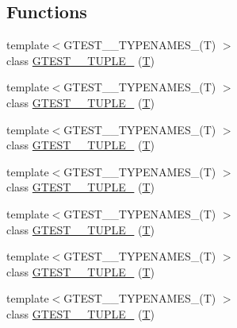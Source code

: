 \subsection*{Functions}
\begin{DoxyCompactItemize}
\item 
{\footnotesize template$<$G\-T\-E\-S\-T\-\_\-\_\-\-T\-Y\-P\-E\-N\-A\-M\-E\-S\-\_\-(\-T) $>$ }\\class \hyperlink{namespacestd_1_1tr1_a9971f52f994f142fe36c786b991cfd3e}{G\-T\-E\-S\-T\-\_\-\_\-\-T\-U\-P\-L\-E\-\_\-} (\hyperlink{calib3d_8hpp_a3efb9551a871ddd0463079a808916717}{T})
\item 
{\footnotesize template$<$G\-T\-E\-S\-T\-\_\-\_\-\-T\-Y\-P\-E\-N\-A\-M\-E\-S\-\_\-(\-T) $>$ }\\class \hyperlink{namespacestd_1_1tr1_a05651180c3a4c06fe0f3b09144b82b93}{G\-T\-E\-S\-T\-\_\-\_\-\-T\-U\-P\-L\-E\-\_\-} (\hyperlink{calib3d_8hpp_a3efb9551a871ddd0463079a808916717}{T})
\item 
{\footnotesize template$<$G\-T\-E\-S\-T\-\_\-\_\-\-T\-Y\-P\-E\-N\-A\-M\-E\-S\-\_\-(\-T) $>$ }\\class \hyperlink{namespacestd_1_1tr1_a368170c49cc7d7f130c0564bbad01205}{G\-T\-E\-S\-T\-\_\-\_\-\-T\-U\-P\-L\-E\-\_\-} (\hyperlink{calib3d_8hpp_a3efb9551a871ddd0463079a808916717}{T})
\item 
{\footnotesize template$<$G\-T\-E\-S\-T\-\_\-\_\-\-T\-Y\-P\-E\-N\-A\-M\-E\-S\-\_\-(\-T) $>$ }\\class \hyperlink{namespacestd_1_1tr1_a661b17d2b7137863f06a016762f5c888}{G\-T\-E\-S\-T\-\_\-\_\-\-T\-U\-P\-L\-E\-\_\-} (\hyperlink{calib3d_8hpp_a3efb9551a871ddd0463079a808916717}{T})
\item 
{\footnotesize template$<$G\-T\-E\-S\-T\-\_\-\_\-\-T\-Y\-P\-E\-N\-A\-M\-E\-S\-\_\-(\-T) $>$ }\\class \hyperlink{namespacestd_1_1tr1_a51b070e2eb5e6bb83a290f35c19667dd}{G\-T\-E\-S\-T\-\_\-\_\-\-T\-U\-P\-L\-E\-\_\-} (\hyperlink{calib3d_8hpp_a3efb9551a871ddd0463079a808916717}{T})
\item 
{\footnotesize template$<$G\-T\-E\-S\-T\-\_\-\_\-\-T\-Y\-P\-E\-N\-A\-M\-E\-S\-\_\-(\-T) $>$ }\\class \hyperlink{namespacestd_1_1tr1_a485b05fdbbcfcf7ad5e4234e17702268}{G\-T\-E\-S\-T\-\_\-\_\-\-T\-U\-P\-L\-E\-\_\-} (\hyperlink{calib3d_8hpp_a3efb9551a871ddd0463079a808916717}{T})
\item 
{\footnotesize template$<$G\-T\-E\-S\-T\-\_\-\_\-\-T\-Y\-P\-E\-N\-A\-M\-E\-S\-\_\-(\-T) $>$ }\\class \hyperlink{namespacestd_1_1tr1_ab451b390a95ee0555d7a43b67ea348aa}{G\-T\-E\-S\-T\-\_\-\_\-\-T\-U\-P\-L\-E\-\_\-} (\hyperlink{calib3d_8hpp_a3efb9551a871ddd0463079a808916717}{T})

\end{DoxyCompactItemize}
